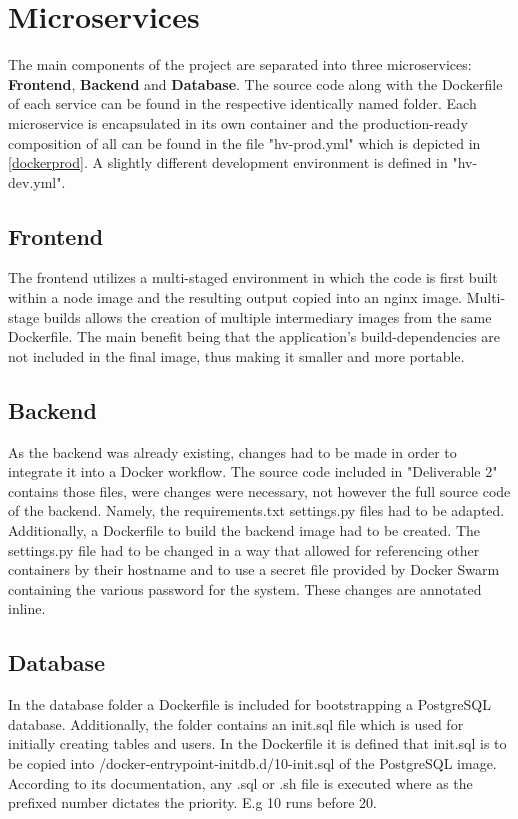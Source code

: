 \section{Microservices}
The main components of the project are separated into three microservices: \textbf{Frontend}, \textbf{Backend} and \textbf{Database}. The source code along with the Dockerfile of each service can be found in the respective identically named folder. Each microservice is encapsulated in its own container and the production-ready composition of all can be found in the file "hv-prod.yml" which is depicted in \autoref{dockerprod}. A slightly different development environment is defined in "hv-dev.yml".

\subsection{Frontend}
The frontend utilizes a multi-staged environment in which the code is first built within a node image and the resulting output copied into an nginx image. Multi-stage builds allows the creation of multiple intermediary images from the same Dockerfile. The main benefit being that the application's build-dependencies are not included in the final image, thus making it smaller and more portable. 

\subsection{Backend}
As the backend was already existing, changes had to be made in order to integrate it into a Docker workflow. The source code included in "Deliverable 2" contains those files, were changes were necessary, not however the full source code of the backend. Namely, the requirements.txt settings.py files had to be adapted. Additionally, a Dockerfile to build the backend image had to be created. The settings.py file had to be changed in a way that allowed for referencing other containers by their hostname and to use a secret file provided by Docker Swarm containing the various password for the system. These changes are annotated inline.

\subsection{Database}
In the database folder a Dockerfile is included for bootstrapping a PostgreSQL database. Additionally, the folder contains an init.sql file which is used for initially creating tables and users. In the Dockerfile it is defined that init.sql is to be copied into /docker-entrypoint-initdb.d/10-init.sql of the PostgreSQL image. According to its documentation, any .sql or .sh file is executed where as the prefixed number dictates the priority. E.g 10 runs before 20.

